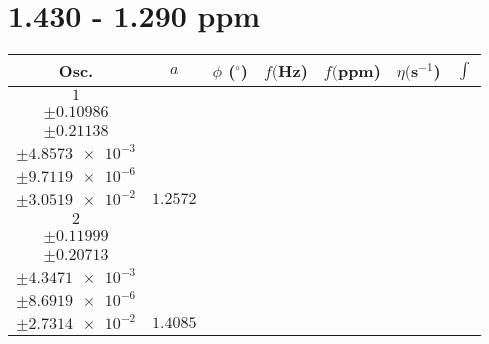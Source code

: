 \documentclass[8pt]{article}
\begin{document}
\section*{1.430 - 1.290 ppm}
\begin{longtable}[l]{c c c c c c c}
\toprule
Osc. & $a$ & $\phi$ ($^{\circ}$) & $f ($Hz) & $f ($ppm) & $\eta ($s$^{-1}$) & $\int$\\
\midrule
$\num{1}$ & \begin{tabular}[c]{@{}c@{}}$\num{29.779}$ \\ $\pm\num{0.10986}$\end{tabular} & \begin{tabular}[c]{@{}c@{}}$\num{0.40049}$ \\ $\pm\num{0.21138}$\end{tabular} & \begin{tabular}[c]{@{}c@{}}$\num{657.12}$ \\ $\pm\num{4.8573e-3}$\end{tabular} & \begin{tabular}[c]{@{}c@{}}$\num{1.3139}$ \\ $\pm\num{9.7119e-6}$\end{tabular} & \begin{tabular}[c]{@{}c@{}}$\num{8.4864}$ \\ $\pm\num{3.0519e-2}$\end{tabular} & $\num{1.2572}$\\
$\num{2}$ & \begin{tabular}[c]{@{}c@{}}$\num{33.191}$ \\ $\pm\num{0.11999}$\end{tabular} & \begin{tabular}[c]{@{}c@{}}$\num{0.33246}$ \\ $\pm\num{0.20713}$\end{tabular} & \begin{tabular}[c]{@{}c@{}}$\num{661.28}$ \\ $\pm\num{4.3471e-3}$\end{tabular} & \begin{tabular}[c]{@{}c@{}}$\num{1.3222}$ \\ $\pm\num{8.6919e-6}$\end{tabular} & \begin{tabular}[c]{@{}c@{}}$\num{8.1158}$ \\ $\pm\num{2.7314e-2}$\end{tabular} & $\num{1.4085}$\\

\end{longtable}
\end{document}
